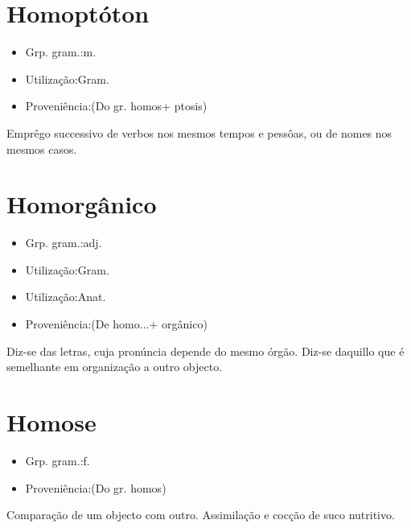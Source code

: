 \documentclass{article}
\begin{document}
\section{Homoptóton}
\begin{itemize}
\item {Grp. gram.:m.}
\end{itemize}
\begin{itemize}
\item {Utilização:Gram.}
\end{itemize}
\begin{itemize}
\item {Proveniência:(Do gr. \textunderscore homos\textunderscore  + \textunderscore ptosis\textunderscore )}
\end{itemize}
Emprêgo successivo de verbos nos mesmos tempos e pessôas, ou de nomes nos mesmos casos.
\section{Homorgânico}
\begin{itemize}
\item {Grp. gram.:adj.}
\end{itemize}
\begin{itemize}
\item {Utilização:Gram.}
\end{itemize}
\begin{itemize}
\item {Utilização:Anat.}
\end{itemize}
\begin{itemize}
\item {Proveniência:(De \textunderscore homo...\textunderscore  + \textunderscore orgânico\textunderscore )}
\end{itemize}
Diz-se das letras, cuja pronúncia depende do mesmo órgão.
Diz-se daquillo que é semelhante em organização a outro objecto.
\section{Homose}
\begin{itemize}
\item {Grp. gram.:f.}
\end{itemize}
\begin{itemize}
\item {Proveniência:(Do gr. \textunderscore homos\textunderscore )}
\end{itemize}
Comparação de um objecto com outro.
Assimilação e cocção de suco nutritivo.
\end{document}
